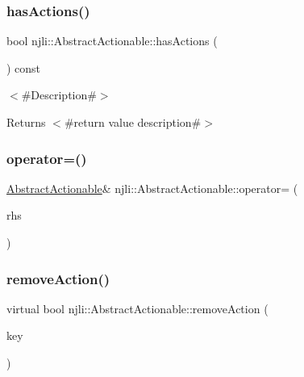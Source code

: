 \mbox{\label{classnjli_1_1_abstract_actionable_a237eba6122f8505a04df9bcc0cd431af}} 
\subsubsection{\texorpdfstring{has\+Actions()}{hasActions()}}
{\footnotesize\ttfamily bool njli\+::\+Abstract\+Actionable\+::has\+Actions (\begin{DoxyParamCaption}{ }\end{DoxyParamCaption}) const}

$<$\#\+Description\#$>$

\begin{DoxyReturn}{Returns}
$<$\#return value description\#$>$ 
\end{DoxyReturn}
\mbox{\label{classnjli_1_1_abstract_actionable_a0f09166a53c6d1b5652ad268fcdfcb46}} 
\subsubsection{\texorpdfstring{operator=()}{operator=()}}
{\footnotesize\ttfamily \mbox{\hyperlink{classnjli_1_1_abstract_actionable}{Abstract\+Actionable}}\& njli\+::\+Abstract\+Actionable\+::operator= (\begin{DoxyParamCaption}\item[{const \mbox{\hyperlink{classnjli_1_1_abstract_actionable}{Abstract\+Actionable}} \&}]{rhs }\end{DoxyParamCaption})\hspace{0.3cm}{\ttfamily [private]}}

\mbox{\label{classnjli_1_1_abstract_actionable_a902395a20ef04482b15e7a65c0be4bad}} 
\subsubsection{\texorpdfstring{remove\+Action()}{removeAction()}}
{\footnotesize\ttfamily virtual bool njli\+::\+Abstract\+Actionable\+::remove\+Action (\begin{DoxyParamCaption}\item[{const char $\ast$}]{key }\end{DoxyParamCaption})\hspace{0.3cm}{\ttfamily [virtual]}}

